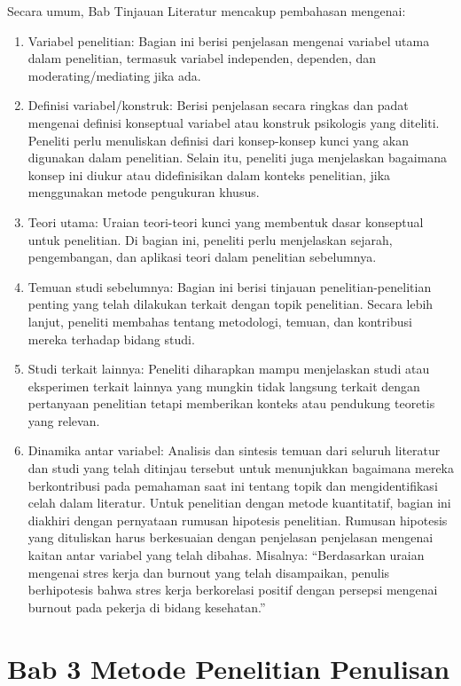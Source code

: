 \documentclass[
  indonesian,
  letterpaper,
]{scrbook}
\providecommand{\tightlist}{%
  \setlength{\itemsep}{0pt}\setlength{\parskip}{0pt}}
\begin{document}
Secara umum, Bab Tinjauan Literatur mencakup pembahasan mengenai:

\begin{enumerate}
\def\labelenumi{\arabic{enumi}.}
\tightlist
\item
  Variabel penelitian: Bagian ini berisi penjelasan mengenai variabel
  utama dalam penelitian, termasuk variabel independen, dependen, dan
  moderating/mediating jika ada.
\item
  Definisi variabel/konstruk: Berisi penjelasan secara ringkas dan padat
  mengenai definisi konseptual variabel atau konstruk psikologis yang
  diteliti. Peneliti perlu menuliskan definisi dari konsep-konsep kunci
  yang akan digunakan dalam penelitian. Selain itu, peneliti juga
  menjelaskan bagaimana konsep ini diukur atau didefinisikan dalam
  konteks penelitian, jika menggunakan metode pengukuran khusus.
\item
  Teori utama: Uraian teori-teori kunci yang membentuk dasar konseptual
  untuk penelitian. Di bagian ini, peneliti perlu menjelaskan sejarah,
  pengembangan, dan aplikasi teori dalam penelitian sebelumnya.
\item
  Temuan studi sebelumnya: Bagian ini berisi tinjauan
  penelitian-penelitian penting yang telah dilakukan terkait dengan
  topik penelitian. Secara lebih lanjut, peneliti membahas tentang
  metodologi, temuan, dan kontribusi mereka terhadap bidang studi.
\item
  Studi terkait lainnya: Peneliti diharapkan mampu menjelaskan studi
  atau eksperimen terkait lainnya yang mungkin tidak langsung terkait
  dengan pertanyaan penelitian tetapi memberikan konteks atau pendukung
  teoretis yang relevan.
\item
  Dinamika antar variabel: Analisis dan sintesis temuan dari seluruh
  literatur dan studi yang telah ditinjau tersebut untuk menunjukkan
  bagaimana mereka berkontribusi pada pemahaman saat ini tentang topik
  dan mengidentifikasi celah dalam literatur. Untuk penelitian dengan
  metode kuantitatif, bagian ini diakhiri dengan pernyataan rumusan
  hipotesis penelitian. Rumusan hipotesis yang dituliskan harus
  berkesuaian dengan penjelasan penjelasan mengenai kaitan antar
  variabel yang telah dibahas. Misalnya: ``Berdasarkan uraian mengenai
  stres kerja dan burnout yang telah disampaikan, penulis berhipotesis
  bahwa stres kerja berkorelasi positif dengan persepsi mengenai burnout
  pada pekerja di bidang kesehatan.''
\end{enumerate}

\section{Bab 3 Metode Penelitian
Penulisan}\label{bab-3-metode-penelitian-penulisan}
\end{document}
